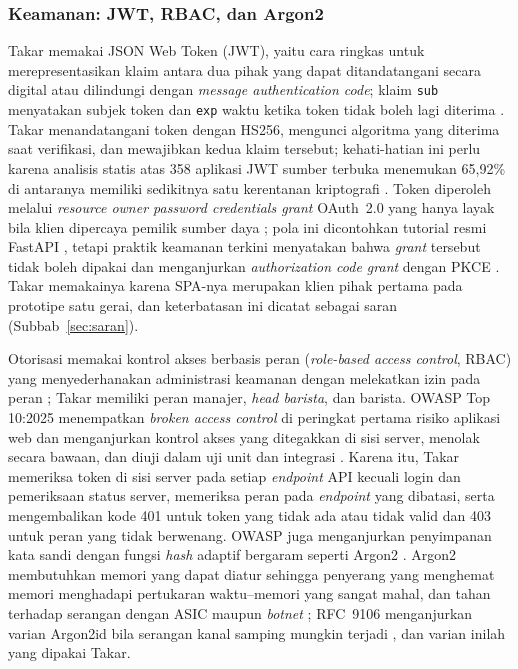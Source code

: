\subsubsection{Keamanan: JWT, RBAC, dan Argon2}
\label{subsubsec:keamanan}

Takar memakai JSON Web Token (JWT), yaitu cara ringkas untuk merepresentasikan klaim antara dua pihak yang dapat ditandatangani secara digital atau dilindungi dengan \textit{message authentication code}; klaim \texttt{sub} menyatakan subjek token dan \texttt{exp} waktu ketika token tidak boleh lagi diterima \citep*{jones2015json}. Takar menandatangani token dengan HS256, mengunci algoritma yang diterima saat verifikasi, dan mewajibkan kedua klaim tersebut; kehati-hatian ini perlu karena analisis statis atas 358 aplikasi JWT sumber terbuka menemukan 65,92\% di antaranya memiliki sedikitnya satu kerentanan kriptografi \citep{xu2024jwtkey}. Token diperoleh melalui \textit{resource owner password credentials grant} OAuth~2.0 yang hanya layak bila klien dipercaya pemilik sumber daya \citep*{hardt2012oauth}; pola ini dicontohkan tutorial resmi FastAPI \citep*{ramirez2026fastapi}, tetapi praktik keamanan terkini menyatakan bahwa \textit{grant} tersebut tidak boleh dipakai dan menganjurkan \textit{authorization code grant} dengan PKCE \citep*{lodderstedt2025best}. Takar memakainya karena SPA-nya merupakan klien pihak pertama pada prototipe satu gerai, dan keterbatasan ini dicatat sebagai saran (Subbab~\ref{sec:saran}).

Otorisasi memakai kontrol akses berbasis peran (\textit{role-based access control}, RBAC) yang menyederhanakan administrasi keamanan dengan melekatkan izin pada peran \citep*{sandhu1996rolebased}; Takar memiliki peran manajer, \textit{head barista}, dan barista. OWASP Top 10:2025 menempatkan \textit{broken access control} di peringkat pertama risiko aplikasi web dan menganjurkan kontrol akses yang ditegakkan di sisi server, menolak secara bawaan, dan diuji dalam uji unit dan integrasi \citep*{owasp2025owasp}. Karena itu, Takar memeriksa token di sisi server pada setiap \textit{endpoint} API kecuali login dan pemeriksaan status server, memeriksa peran pada \textit{endpoint} yang dibatasi, serta mengembalikan kode 401 untuk token yang tidak ada atau tidak valid dan 403 untuk peran yang tidak berwenang. OWASP juga menganjurkan penyimpanan kata sandi dengan fungsi \textit{hash} adaptif bergaram seperti Argon2 \citep*{owasp2025owasp}. Argon2 membutuhkan memori yang dapat diatur sehingga penyerang yang menghemat memori menghadapi pertukaran waktu--memori yang sangat mahal, dan tahan terhadap serangan dengan ASIC maupun \textit{botnet} \citep*{biryukov2016argon2}; RFC~9106 menganjurkan varian Argon2id bila serangan kanal samping mungkin terjadi \citep*{biryukov2021argon2}, dan varian inilah yang dipakai Takar.

